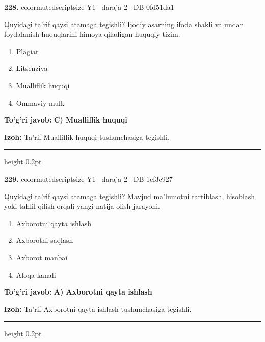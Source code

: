 \documentclass[10pt,a4paper,oneside]{article}
\begin{document}
\noindent\textbf{\color{ink}228.}  {color{muted}scriptsize Y1 \textbullet\ daraja 2 \textbullet\ DB 0fd51da1}
\par
Quyidagi ta'rif qaysi atamaga tegishli? Ijodiy asarning ifoda shakli va undan foydalanish huquqlarini himoya qiladigan huquqiy tizim.
\begin{enumerate}[label=\Alph*),leftmargin=9mm]
\item Plagiat
\item Litsenziya
\item Mualliflik huquqi
\item Ommaviy mulk
\end{enumerate}
\begin{tcolorbox}[enhanced,breakable,colback=teal!4,colframe=teal!50!black,boxrule=0.5pt,arc=1.1mm,left=3mm,right=3mm,top=1.7mm,bottom=1.7mm,before skip=2mm,after skip=2mm]
\textbf{\color{teal}To'g'ri javob:} \textbf{C) Mualliflik huquqi}
\par\smallskip
\textbf{Izoh:} Ta'rif Mualliflik huquqi tushunchasiga tegishli.
\end{tcolorbox}
\vspace{2mm}\hrule height 0.2pt \vspace{3mm}

\noindent\textbf{\color{ink}229.}  {color{muted}scriptsize Y1 \textbullet\ daraja 2 \textbullet\ DB 1cf3c927}
\par
Quyidagi ta'rif qaysi atamaga tegishli? Mavjud ma'lumotni tartiblash, hisoblash yoki tahlil qilish orqali yangi natija olish jarayoni.
\begin{enumerate}[label=\Alph*),leftmargin=9mm]
\item Axborotni qayta ishlash
\item Axborotni saqlash
\item Axborot manbai
\item Aloqa kanali
\end{enumerate}
\begin{tcolorbox}[enhanced,breakable,colback=teal!4,colframe=teal!50!black,boxrule=0.5pt,arc=1.1mm,left=3mm,right=3mm,top=1.7mm,bottom=1.7mm,before skip=2mm,after skip=2mm]
\textbf{\color{teal}To'g'ri javob:} \textbf{A) Axborotni qayta ishlash}
\par\smallskip
\textbf{Izoh:} Ta'rif Axborotni qayta ishlash tushunchasiga tegishli.
\end{tcolorbox}
\vspace{2mm}\hrule height 0.2pt \vspace{3mm}
\end{document}
